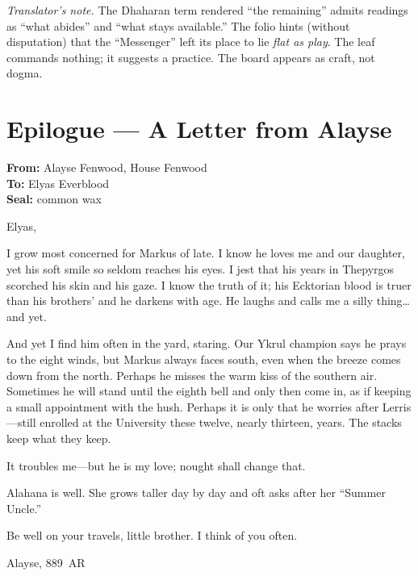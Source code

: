 \documentclass[11pt]{article}
\numberwithin{equation}{section} %
\theoremstyle{plain} %
\theoremstyle{definition} %
\theoremstyle{remark} %
\begin{document}
\medskip
\noindent\textit{Translator’s note.} The Dhaharan term rendered “the remaining” admits readings as “what abides” and “what stays available.” The folio hints (without disputation) that the “Messenger” left its place to lie \emph{flat as play}. The leaf commands nothing; it suggests a practice. The board appears as craft, not dogma.

\section*{Epilogue — A Letter from Alayse}

\noindent\textbf{From:} Alayse Fenwood, House Fenwood \\
\textbf{To:} Elyas Everblood \\
\textbf{Seal:} common wax

\medskip
\noindent Elyas,

I grow most concerned for Markus of late. I know he loves me and our daughter, yet his soft smile so seldom reaches his eyes. I jest that his years in Thepyrgos scorched his skin and his gaze. I know the truth of it; his Ecktorian blood is truer than his brothers’ and he darkens with age. He laughs and calls me a silly thing\ldots{} and yet.

And yet I find him often in the yard, staring. Our Ykrul champion says he prays to the eight winds, but Markus always faces south, even when the breeze comes down from the north. Perhaps he misses the warm kiss of the southern air. Sometimes he will stand until the eighth bell and only then come in, as if keeping a small appointment with the hush. Perhaps it is only that he worries after Lerris---still enrolled at the University these twelve, nearly thirteen, years. The stacks keep what they keep.

It troubles me---but he is my love; nought shall change that.

Alahana is well. She grows taller day by day and oft asks after her ``Summer Uncle.''

Be well on your travels, little brother. I think of you often.

\medskip
\noindent Alayse, 889~AR
\end{document}
